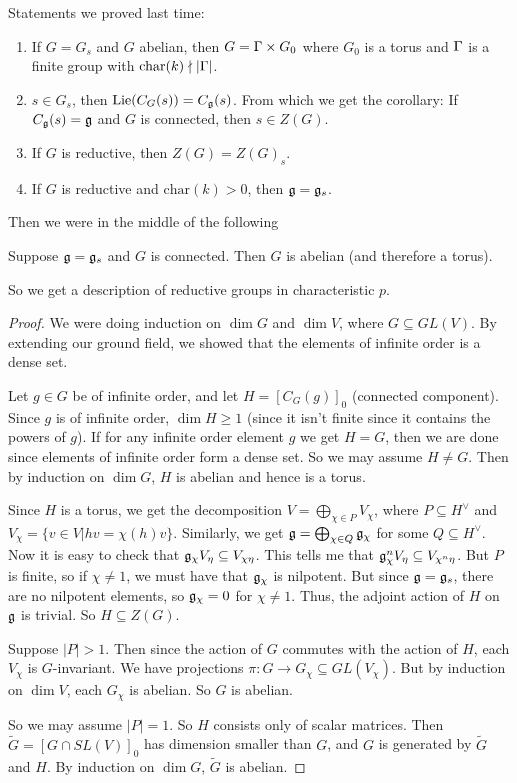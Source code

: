 
Statements we proved last time:
\begin{enumerate}
 \item If $G=G_s$ and $G$ abelian, then $G=\Gamma\times G_0$ where $G_0$ is a torus and $\Gamma$ is a finite group with $\mathrm{char}(k)\nmid |\Gamma|$.
 \item $s\in G_s$, then $\operatorname{Lie}(C_G(s))=C_{\mathfrak{g}}(s)$. From which we get the corollary: If $C_{\mathfrak{g}}(s)=\mathfrak{g}$ and $G$ is connected, then $s\in Z(G)$.
 \item If $G$ is reductive, then $Z(G)=Z(G)_s$.
 \item If $G$ is reductive and $\mathrm{char}(k)>0$, then $\mathfrak{g}=\mathfrak{g}_s$.
\end{enumerate}
Then we were in the middle of the following
\begin{proposition}
 Suppose $\mathfrak{g}=\mathfrak{g}_s$ and $G$ is connected. Then $G$ is abelian (and therefore a torus).
\end{proposition}
So we get a description of reductive groups in characteristic $p$.
\begin{proof}
 We were doing induction on $\dim G$ and $\dim V$, where $G\subseteq GL(V)$. By extending our ground field, we showed that the elements of infinite order is a dense set.
 
 Let $g\in G$ be of infinite order, and let $H=[C_G(g)]_0$ (connected component). Since $g$ is of infinite order, $\dim H\ge 1$ (since it isn't finite since it contains the powers of $g$). If for any infinite order element $g$ we get $H=G$, then we are done since elements of infinite order form a dense set. So we may assume $H\neq G$. Then by induction on $\dim G$, $H$ is abelian and hence is a torus.
 
 Since $H$ is a torus, we get the decomposition $V=\bigoplus_{\chi\in P} V_\chi$, where $P\subseteq H^\vee$ and $V_\chi=\{v\in V| hv=\chi(h)v\}$. Similarly, we get $\mathfrak{g}=\bigoplus_{\chi\in Q} \mathfrak{g}_\chi$ for some $Q\subseteq H^\vee$. Now it is easy to check that $\mathfrak{g}_\chi V_\eta\subseteq V_{\chi\eta}$. This tells me that $\mathfrak{g}_\chi^n V_\eta\subseteq V_{\chi^n\eta}$. But $P$ is finite, so if $\chi\neq 1$, we must have that $\mathfrak{g}_\chi$ is nilpotent. But since $\mathfrak{g}=\mathfrak{g}_s$, there are no nilpotent elements, so $\mathfrak{g}_\chi=0$ for $\chi\neq 1$. Thus, the adjoint action of $H$ on $\mathfrak{g}$ is trivial. So $H\subseteq Z(G)$.
 
 Suppose $|P|>1$. Then since the action of $G$ commutes with the action of $H$, each $V_\chi$ is $G$-invariant. We have projections $\pi\colon G\to G_\chi\subseteq GL(V_\chi)$. But by induction on $\dim V$, each $G_\chi$ is abelian. So $G$ is abelian.
 
 So we may assume $|P|=1$. So $H$ consists only of scalar matrices. Then $\tilde G=[G\cap SL(V)]_0$ has dimension smaller than $G$, and $G$ is generated by $\tilde G$ and $H$. By induction on $\dim G$, $\tilde G$ is abelian.
\end{proof}
